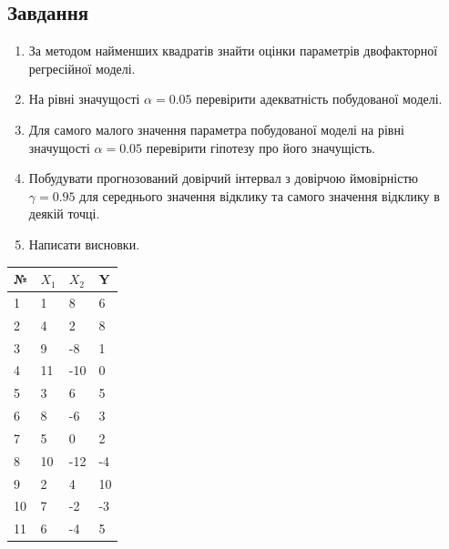 \documentclass{article}
\begin{document}
    \subsection{Завдання}
      \begin{enumerate}
        \item За методом найменших квадратів знайти оцінки параметрів двофакторної регресійної моделі.
        \item На рівні значущості $\alpha = 0.05$ перевірити адекватність побудованої моделі.
        \item Для самого малого значення параметра побудованої моделі на рівні значущості $\alpha = 0.05$ перевірити гіпотезу про його значущість.
        \item Побудувати прогнозований довірчий інтервал з довірчою ймовірністю $\gamma = 0.95$ для середнього значення відклику та самого  значення відклику в деякій точці.
        \item Написати висновки.
      \end{enumerate}
      \begin{center}
        \begin{tabular}{|l|l|l|l|}
          \hline
          № & $X_1$ & $X_2$ & Y \\
          \hline
          1 & 1 & 8 & 6\\
          2 & 4 & 2 & 8\\
          3 & 9 & -8 & 1\\
          4 & 11 & -10 & 0\\
          5 & 3 & 6 & 5\\
          6 & 8 & -6 & 3\\
          7 & 5 & 0 & 2\\
          8 & 10 & -12 & -4\\
          9 & 2 & 4 & 10\\
          10 & 7 & -2 & -3\\
          11 & 6 & -4 & 5\\
          \hline
        \end{tabular}
      \end{center}
\end{document}
